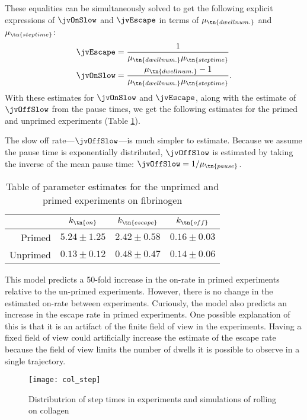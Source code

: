These equalities can be simultaneously solved to get the following
explicit expressions of $\jvOnSlow$ and $\jvEscape$ in terms of
$\mu_\tn{dwell num.}$ and $\mu_\tn{step time}$:
\begin{align}
  \jvEscape &= \frac{1}{\mu_\tn{dwell num.} \mu_\tn{step time}} \\
  \jvOnSlow &= \frac{\mu_\tn{dwell num.} - 1}{\mu_\tn{dwell num.}
              \mu_\tn{step time}}.
\end{align}
With these estimates for $\jvOnSlow$ and $\jvEscape$, along with the
estimate of $\jvOffSlow$ from the pause times, we get the following
estimates for the primed and unprimed experiments (Table
\ref{tab:par-est}).

The slow off rate---$\jvOffSlow$---is much simpler to
estimate. Because we assume the pause time is exponentially
distributed, $\jvOffSlow$ is estimated by taking the inverse of the
mean pause time: $\jvOffSlow = 1/\mu_\tn{pause}$.

\begin{table}
  \centering
  \begin{tabular}{rccc} \toprule
    & $k_\tn{on}$ & $k_\tn{escape}$ & $k_\tn{off}$ \\ \midrule
    Primed & $5.24 \pm 1.25$ & $2.42 \pm 0.58$ & $0.16 \pm 0.03$ \\
    Unprimed & $0.13 \pm 0.12$ & $0.48 \pm 0.47$ & $0.14 \pm 0.06$ \\
    \bottomrule 
  \end{tabular}
  \caption{Table of parameter estimates for the unprimed and primed
    experiments on fibrinogen}
  \label{tab:par-est}
\end{table}

This model predicts a 50-fold increase in the on-rate in primed
experiments relative to the un-primed experiments. However, there is
no change in the estimated on-rate between experiments. Curiously, the
model also predicts an increase in the escape rate in primed
experiments. One possible explanation of this is that it is an
artifact of the finite field of view in the experiments. Having a
fixed field of view could artificially increase the estimate of the
escape rate because the field of view limits the number of dwells it
is possible to observe in a single trajectory.

\begin{figure}
  \centering
  \texttt{[image: col\_step]}
  \caption[Step times on collagen]{Distributrion of step times in
    experiments and simulations of rolling on collagen}
  \label{fig:col-step}
\end{figure}

